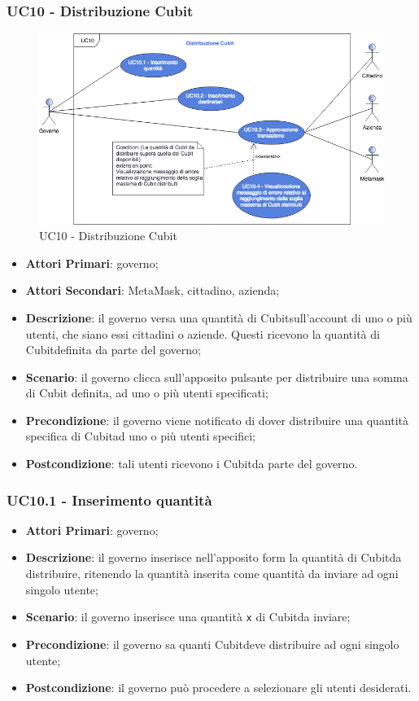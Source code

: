 \subsubsection{UC10 - Distribuzione Cubit}
\begin{figure}[h]
	\includegraphics[width=13.5cm]{res/images/UC10Distribuzione.png} %
	\centering
	\caption{UC10 - Distribuzione Cubit}
	
\end{figure}
\begin{itemize}
	\item \textbf{Attori Primari}: governo;
	\item \textbf{Attori Secondari}: MetaMask\glo, cittadino, azienda\glo;
	\item \textbf{Descrizione}: il governo versa una quantità di Cubit\glosp sull'account di uno o più  utenti, che siano essi cittadini o aziende. Questi ricevono la quantità di Cubit\glosp definita da parte del governo;
	\item \textbf{Scenario}: il governo clicca sull'apposito pulsante per distribuire una somma di Cubit definita, ad uno o più utenti specificati; 
	\item \textbf{Precondizione}: il governo viene notificato di dover distribuire una quantità specifica di Cubit\glosp ad uno o più utenti specifici;
	\item \textbf{Postcondizione}: tali utenti ricevono i Cubit\glosp da parte del governo.
\end{itemize}
\subsubsection{UC10.1 - Inserimento quantità}
\begin{itemize}
	\item \textbf{Attori Primari}: governo;
	\item \textbf{Descrizione}: il governo inserisce nell'apposito form la quantità di Cubit\glosp da distribuire, ritenendo la quantità inserita come quantità da inviare ad ogni singolo utente;
	\item \textbf{Scenario}: il governo inserisce una quantità \texttt{x} di Cubit\glosp da inviare;
	\item \textbf{Precondizione}: il governo sa quanti Cubit\glosp deve distribuire ad ogni singolo utente;
	\item \textbf{Postcondizione}: il governo può procedere a selezionare gli utenti desiderati.
\end{itemize}
